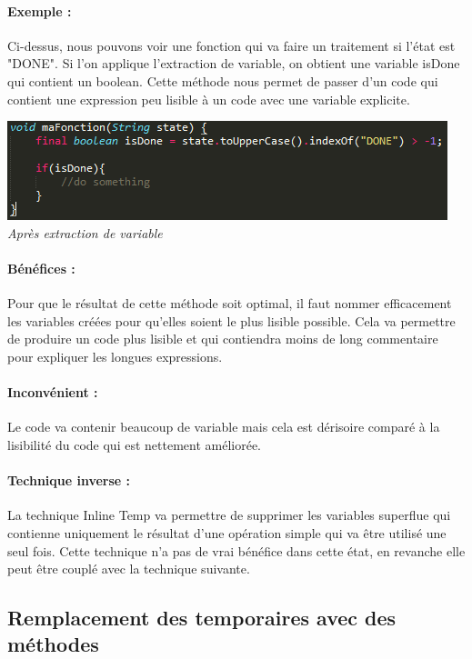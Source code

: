 \documentclass[a4paper,twoside,12pt,openright]{report}
\begin{document}
\paragraph{Exemple :}
Ci-dessus, nous pouvons voir une fonction qui va faire un traitement si l'état est "DONE".
Si l'on applique l'extraction de variable, on obtient une variable isDone qui contient un boolean. Cette méthode nous permet de passer d'un code qui contient une expression peu lisible à un code avec une variable explicite.

\begin{center}
\includegraphics[scale=1]{Image/Extraction_Variable2.png}\\
\itshape{Après extraction de variable}
\end{center}

\paragraph{Bénéfices :}
Pour que le résultat de cette méthode soit optimal, il faut nommer efficacement les variables créées pour  qu'elles soient le plus lisible possible. Cela va permettre de produire un code plus lisible et qui contiendra moins de long commentaire pour expliquer les longues expressions.

\paragraph{Inconvénient :}
Le code va contenir beaucoup de variable mais cela est dérisoire comparé à la lisibilité du code qui est nettement améliorée.

\paragraph{Technique inverse :}
La technique Inline Temp va permettre de supprimer les variables superflue qui contienne uniquement le résultat d'une opération simple qui va être utilisé une seul fois. Cette technique n'a pas de vrai bénéfice dans cette état, en revanche elle peut être couplé avec la technique suivante.\\

\subsection{Remplacement des temporaires avec des méthodes}
\end{document}
